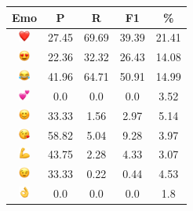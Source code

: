 \documentclass{article}
\begin{document}
\begin{table}
\centering
\begin{tabular}{|c|ccc|c|} \hline
\textbf{Emo} & \textbf{P} & \textbf{R} & \textbf{F1} & \textbf{\%} \\ \hline
\includegraphics[height=0.37cm,width=0.37cm]{img/red_heart.png} & 27.45 & 69.69 & 39.39 & 21.41\\ 
\includegraphics[height=0.37cm,width=0.37cm]{img/smiling_face_with_hearteyes.png} & 22.36 & 32.32 & 26.43 & 14.08\\ 
\includegraphics[height=0.37cm,width=0.37cm]{img/face_with_tears_of_joy.png} & 41.96 & 64.71 & 50.91 & 14.99\\ 
\includegraphics[height=0.37cm,width=0.37cm]{img/two_hearts.png} & 0.0 & 0.0 & 0.0 & 3.52\\ 
\includegraphics[height=0.37cm,width=0.37cm]{img/smiling_face_with_smiling_eyes.png} & 33.33 & 1.56 & 2.97 & 5.14\\ 
\includegraphics[height=0.37cm,width=0.37cm]{img/face_blowing_a_kiss.png} & 58.82 & 5.04 & 9.28 & 3.97\\ 
\includegraphics[height=0.37cm,width=0.37cm]{img/flexed_biceps.png} & 43.75 & 2.28 & 4.33 & 3.07\\ 
\includegraphics[height=0.37cm,width=0.37cm]{img/winking_face.png} & 33.33 & 0.22 & 0.44 & 4.53\\ 
\includegraphics[height=0.37cm,width=0.37cm]{img/OK_hand.png} & 0.0 & 0.0 & 0.0 & 1.8\\ 

\end{tabular}
\end{table}
\end{document}
